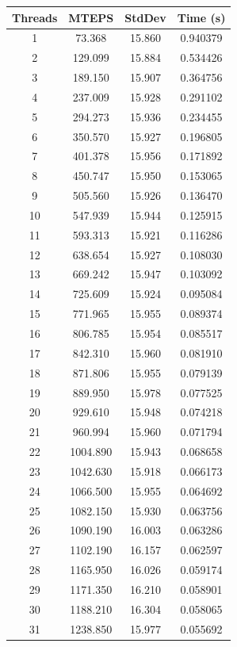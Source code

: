 \documentclass[10pt,twocolumn,letterpaper]{article}
\begin{document}
\begin{table}[h]
\renewcommand\arraystretch{0.8}
\centering
\begin{tabular}{@{}c|ccc@{}}
\toprule
Threads          & MTEPS  & StdDev     & Time (s)      \\ \midrule
1 & 73.368 & 15.860 & 0.940379 \\
2 & 129.099 & 15.884 & 0.534426 \\
3 & 189.150 & 15.907 & 0.364756 \\
4 & 237.009 & 15.928 & 0.291102 \\
5 & 294.273 & 15.936 & 0.234455 \\
6 & 350.570 & 15.927 & 0.196805 \\
7 & 401.378 & 15.956 & 0.171892 \\
8 & 450.747 & 15.950 & 0.153065 \\
9 & 505.560 & 15.926 & 0.136470 \\
10 & 547.939 & 15.944 & 0.125915 \\
11 & 593.313 & 15.921 & 0.116286 \\
12 & 638.654 & 15.927 & 0.108030 \\
13 & 669.242 & 15.947 & 0.103092 \\
14 & 725.609 & 15.924 & 0.095084 \\
15 & 771.965 & 15.955 & 0.089374 \\
16 & 806.785 & 15.954 & 0.085517 \\
17 & 842.310 & 15.960 & 0.081910 \\
18 & 871.806 & 15.955 & 0.079139 \\
19 & 889.950 & 15.978 & 0.077525 \\
20 & 929.610 & 15.948 & 0.074218 \\
21 & 960.994 & 15.960 & 0.071794 \\
22 & 1004.890 & 15.943 & 0.068658 \\
23 & 1042.630 & 15.918 & 0.066173 \\
24 & 1066.500 & 15.955 & 0.064692 \\
25 & 1082.150 & 15.930 & 0.063756 \\
26 & 1090.190 & 16.003 & 0.063286 \\
27 & 1102.190 & 16.157 & 0.062597 \\
28 & 1165.950 & 16.026 & 0.059174 \\
29 & 1171.350 & 16.210 & 0.058901 \\
30 & 1188.210 & 16.304 & 0.058065 \\
31 & 1238.850 & 15.977 & 0.055692 \\

\end{tabular}
\end{table}
\end{document}
